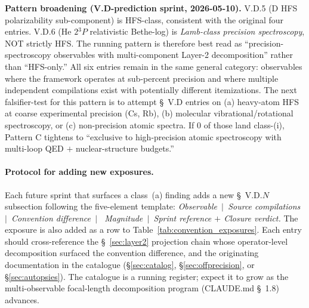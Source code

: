 \documentclass[11pt]{article}
\begin{document}
\textbf{Pattern broadening (V.D-prediction sprint, 2026-05-10).}  V.D.5
(D HFS polarizability sub-component) is HFS-class, consistent with the
original four entries.  V.D.6 (He $2{}^3P$ relativistic Bethe-log) is
\emph{Lamb-class precision spectroscopy}, NOT strictly HFS.  The
running pattern is therefore best read as ``precision-spectroscopy
observables with multi-component Layer-2 decomposition'' rather than
``HFS-only.''  All six entries remain in the same general category:
observables where the framework operates at sub-percent precision and
where multiple independent compilations exist with potentially different
itemizations.  The next falsifier-test for this pattern is to attempt
\S~V.D entries on (a) heavy-atom HFS at coarse experimental precision
(Cs, Rb), (b) molecular vibrational/rotational spectroscopy, or (c)
non-precision atomic spectra.  If 0 of those land class-(i), Pattern C
tightens to ``exclusive to high-precision atomic spectroscopy with
multi-loop QED $+$ nuclear-structure budgets.''

\paragraph{Protocol for adding new exposures.}
Each future sprint that surfaces a class~(a) finding adds a new
\S~V.D.$N$ subsection following the five-element template:
\emph{Observable~$|$~Source compilations~$|$~Convention difference~$|$
~Magnitude~$|$~Sprint reference $+$ Closure verdict.}  The exposure
is also added as a row to Table~\ref{tab:convention_exposures}.
Each entry should cross-reference the \S~\ref{sec:layer2} projection
chain whose operator-level decomposition surfaced the convention
difference, and the originating documentation in the catalogue
(\S\ref{sec:catalog}, \S\ref{sec:offprecision}, or \S\ref{sec:autopsies}).
The catalogue is a running register; expect it to grow as the
multi-observable focal-length decomposition program (CLAUDE.md
\S~1.8) advances.
\end{document}
